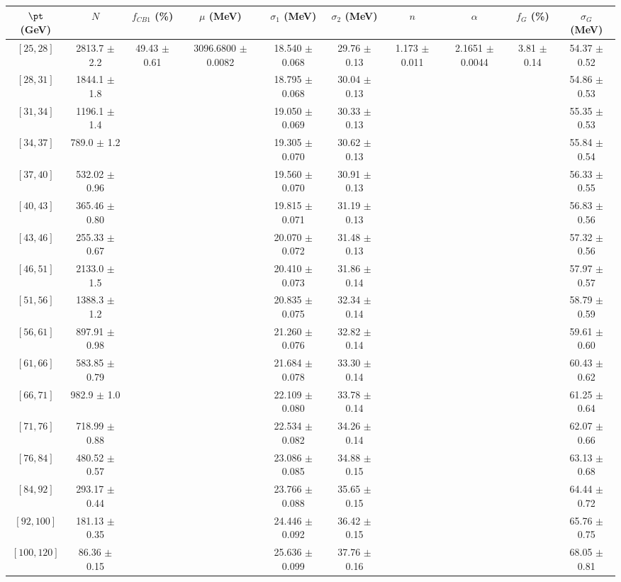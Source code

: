 \begin{tabular}{c||c|c|c|c|c|c|c|c|c}
$\pt$ (GeV) & $N$ & $f_{CB1}$ (\%)  & $\mu$ (MeV) & $\sigma_1$ (MeV) & $\sigma_2$ (MeV) & $n$ & $\alpha$ & $f_G$ (\%) & $\sigma_G$ (MeV) \\
\hline
$[25, 28]$ & 2813.7 $\pm$ 2.2 & \multirow{17}{*}{49.43 $\pm$ 0.61} & \multirow{17}{*}{3096.6800 $\pm$ 0.0082} & 18.540 $\pm$ 0.068 & 29.76 $\pm$ 0.13 & \multirow{17}{*}{1.173 $\pm$ 0.011} & \multirow{17}{*}{2.1651 $\pm$ 0.0044} & \multirow{17}{*}{3.81 $\pm$ 0.14} & 54.37 $\pm$ 0.52\\
$[28, 31]$ & 1844.1 $\pm$ 1.8 &  &  & 18.795 $\pm$ 0.068 & 30.04 $\pm$ 0.13 &  &  &  & 54.86 $\pm$ 0.53\\
$[31, 34]$ & 1196.1 $\pm$ 1.4 &  &  & 19.050 $\pm$ 0.069 & 30.33 $\pm$ 0.13 &  &  &  & 55.35 $\pm$ 0.53\\
$[34, 37]$ & 789.0 $\pm$ 1.2 &  &  & 19.305 $\pm$ 0.070 & 30.62 $\pm$ 0.13 &  &  &  & 55.84 $\pm$ 0.54\\
$[37, 40]$ & 532.02 $\pm$ 0.96 &  &  & 19.560 $\pm$ 0.070 & 30.91 $\pm$ 0.13 &  &  &  & 56.33 $\pm$ 0.55\\
$[40, 43]$ & 365.46 $\pm$ 0.80 &  &  & 19.815 $\pm$ 0.071 & 31.19 $\pm$ 0.13 &  &  &  & 56.83 $\pm$ 0.56\\
$[43, 46]$ & 255.33 $\pm$ 0.67 &  &  & 20.070 $\pm$ 0.072 & 31.48 $\pm$ 0.13 &  &  &  & 57.32 $\pm$ 0.56\\
$[46, 51]$ & 2133.0 $\pm$ 1.5 &  &  & 20.410 $\pm$ 0.073 & 31.86 $\pm$ 0.14 &  &  &  & 57.97 $\pm$ 0.57\\
$[51, 56]$ & 1388.3 $\pm$ 1.2 &  &  & 20.835 $\pm$ 0.075 & 32.34 $\pm$ 0.14 &  &  &  & 58.79 $\pm$ 0.59\\
$[56, 61]$ & 897.91 $\pm$ 0.98 &  &  & 21.260 $\pm$ 0.076 & 32.82 $\pm$ 0.14 &  &  &  & 59.61 $\pm$ 0.60\\
$[61, 66]$ & 583.85 $\pm$ 0.79 &  &  & 21.684 $\pm$ 0.078 & 33.30 $\pm$ 0.14 &  &  &  & 60.43 $\pm$ 0.62\\
$[66, 71]$ & 982.9 $\pm$ 1.0 &  &  & 22.109 $\pm$ 0.080 & 33.78 $\pm$ 0.14 &  &  &  & 61.25 $\pm$ 0.64\\
$[71, 76]$ & 718.99 $\pm$ 0.88 &  &  & 22.534 $\pm$ 0.082 & 34.26 $\pm$ 0.14 &  &  &  & 62.07 $\pm$ 0.66\\
$[76, 84]$ & 480.52 $\pm$ 0.57 &  &  & 23.086 $\pm$ 0.085 & 34.88 $\pm$ 0.15 &  &  &  & 63.13 $\pm$ 0.68\\
$[84, 92]$ & 293.17 $\pm$ 0.44 &  &  & 23.766 $\pm$ 0.088 & 35.65 $\pm$ 0.15 &  &  &  & 64.44 $\pm$ 0.72\\
$[92, 100]$ & 181.13 $\pm$ 0.35 &  &  & 24.446 $\pm$ 0.092 & 36.42 $\pm$ 0.15 &  &  &  & 65.76 $\pm$ 0.75\\
$[100, 120]$ & 86.36 $\pm$ 0.15 &  &  & 25.636 $\pm$ 0.099 & 37.76 $\pm$ 0.16 &  &  &  & 68.05 $\pm$ 0.81\\
\end{tabular}
